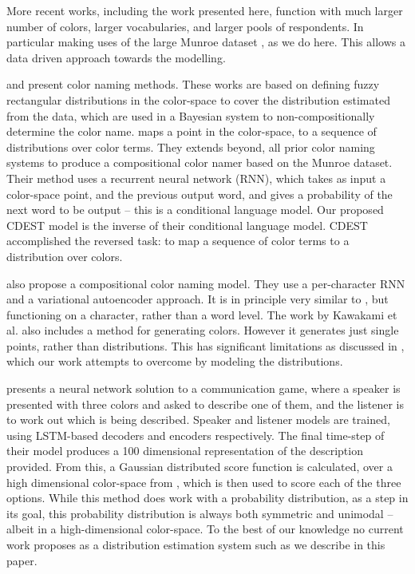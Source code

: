 \documentclass[11pt,a4paper]{article}
\newcommand{\textcite}{\cite}
\begin{document}
More recent works, including the work presented here, function with much larger number of colors, larger vocabularies, and larger pools of respondents.
In particular making uses of the large Munroe dataset \textcite{Munroe2010XKCDdataset}, as we do here.
This allows a data driven approach towards the modelling.

\textcite{mcmahan2015bayesian} and \textcite{meomcmahanstone:color} present color naming methods.
These works are based on defining fuzzy rectangular distributions in the color-space to cover the distribution estimated from the data, which are used in a Bayesian system to non-compositionally determine the color name.
%
%
\textcite{2016arXiv160603821M} maps a point in the color-space, to a sequence of distributions over color terms.
They extends beyond, all prior color naming systems to produce a compositional color namer based on the Munroe dataset.
Their method uses a recurrent neural network (RNN), which takes as input a color-space point, and the previous output word, and gives a probability of the next word to be output -- this is a conditional language model.
Our proposed CDEST model is the inverse of their conditional language model.
CDEST accomplished the reversed task: to map a sequence of color terms to a distribution over colors.


\textcite{DBLP:journals/corr/KawakamiDRS16} also propose a compositional color naming model.
They use a per-character RNN and a variational autoencoder approach.
It is in principle very similar to \textcite{2016arXiv160603821M}, but functioning on a character, rather than a word level.
The work by Kawakami et al. also includes a method for generating colors.
However it generates just single points, rather than distributions.
This has significant limitations as discussed in , which our work attempts to overcome by modeling the distributions.

\textcite{DBLP:journals/corr/MonroeHGP17} presents a neural network solution to a communication game, where a speaker is presented with three colors and asked to describe one of them, and the listener is to work out which is being described.
Speaker and listener models are trained, using LSTM-based decoders and encoders respectively.
The final time-step of their model produces a 100 dimensional representation of the description provided.
From this, a Gaussian distributed score function is calculated, over a high dimensional color-space from \textcite{2016arXiv160603821M}, which is then used to score each of the three options.
While this method does work with a probability distribution, as a step in its goal,
this probability distribution is always both symmetric and unimodal -- albeit in a high-dimensional color-space.
To the best of our knowledge no current work proposes as a distribution estimation system such as we describe in this paper.
\end{document}
